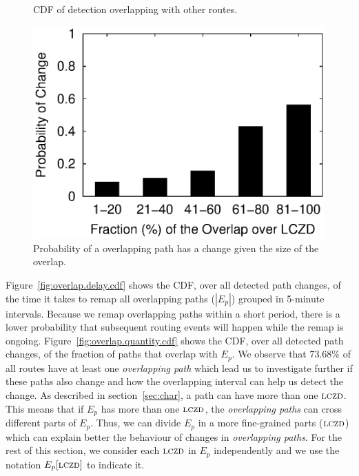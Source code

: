 \begin{figure}
\begin{minipage}{0.32\textwidth}
\caption{CDF of detection overlapping with other routes.}
\label{fig:overlap.quantity.cdf}
\end{minipage}
%
\hfill
\begin{minipage}{0.32\textwidth}
\includegraphics[width=1.05\columnwidth]{figs/patching/probchange/probchange.eps}
\caption{Probability of a overlapping path has a change given the size of the overlap.}
\label{fig:overlap.change.prob}
\end{minipage}
\end{figure}


Figure~\ref{fig:overlap.delay.cdf} shows the CDF, over all detected
path changes, of the time it takes to remap all
overlapping paths ($|E_p|$) grouped in 5-minute intervals.  
Because we remap overlapping paths within
a short period, there is a lower probability that subsequent routing
events will happen while the remap is ongoing. 
Figure~\ref{fig:overlap.quantity.cdf} shows the CDF, over all
detected path changes, of the fraction of paths that overlap with $E_p$.  
We observe that 73.68\% of all routes have at least one 
\emph{overlapping path} which lead us to investigate further if these
paths also change and how the overlapping interval can help us detect the change.
As described in section~\ref{sec:char}, a path can have more than one
$\mathrm{\textsc{lczd}}$. This means that if $E_p$ has more than one $\mathrm{\textsc{lczd}}$, the \emph{overlapping
paths} can cross different parts of $E_p$. Thus, we can divide $E_p$ in a more
fine-grained parts ($\mathrm{\textsc{lczd}}$) which can explain better the behaviour of changes in
\emph{overlapping paths}. For the rest of this section, we
consider each $\mathrm{\textsc{lczd}}$ in $E_p$ independently and we use the notation $E_p[\mathrm{\textsc{lczd}}]$ 
to indicate it. 

